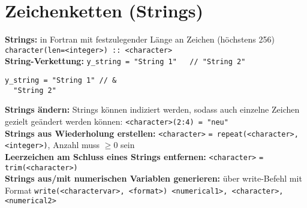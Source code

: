 \documentclass[a4paper, twocolumn]{scrarticle}
\begin{document}
\section{Zeichenketten (\glqq Strings\grqq)}
\textbf{Strings:} in Fortran mit festzulegender Länge an Zeichen  (höchstens 256) \lstinline|character(len=<integer>) :: <character>|\\
\textbf{String-Verkettung:} \lstinline|y_string = "String 1"   // "String 2"|
\begin{lstlisting}[caption={\bfseries Beispiel: String-Verkettung über Code-Zeilen hinweg},label=lst:stringkette]
  y_string = "String 1" // &
  "String 2"
\end{lstlisting}
\textbf{Strings ändern:} Strings können indiziert werden, sodass auch einzelne Zeichen gezielt geändert werden können: \lstinline|<character>(2:4) = "neu"|\\
\textbf{Strings aus Wiederholung erstellen:} \lstinline|<character>| \lstinline|= repeat(<character>, <integer>)|, Anzahl muss $\geq 0$ sein\\
\textbf{Leerzeichen am Schluss eines Strings entfernen:} \lstinline|<character>| \lstinline|= trim(<character>)| \\
\textbf{Strings aus/mit numerischen Variablen generieren:} über write-Befehl mit Format \lstinline|write(<charactervar>, <format>) <numerical1>, <character>, <numerical2>|
\end{document}
